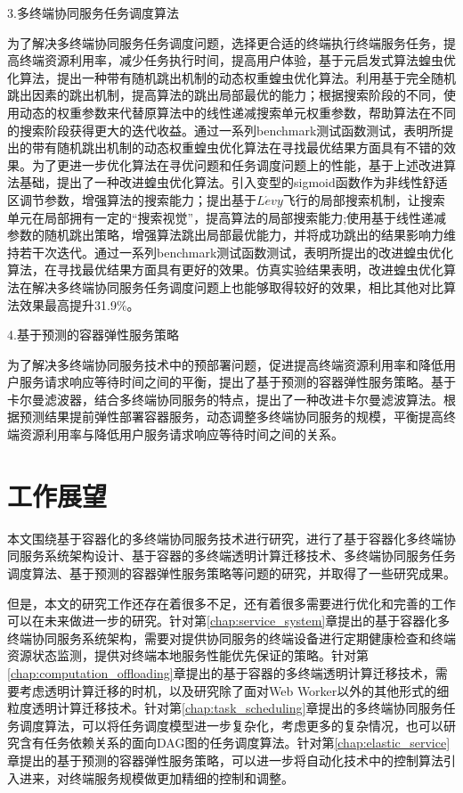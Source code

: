 3.多终端协同服务任务调度算法 

为了解决多终端协同服务任务调度问题，选择更合适的终端执行终端服务任务，提高终端资源利用率，减少任务执行时间，提高用户体验，基于元启发式算法蝗虫优化算法，提出一种带有随机跳出机制的动态权重蝗虫优化算法。利用基于完全随机跳出因素的跳出机制，提高算法的跳出局部最优的能力；根据搜索阶段的不同，使用动态的权重参数来代替原算法中的线性递减搜索单元权重参数，帮助算法在不同的搜索阶段获得更大的迭代收益。通过一系列benchmark测试函数测试，表明所提出的带有随机跳出机制的动态权重蝗虫优化算法在寻找最优结果方面具有不错的效果。为了更进一步优化算法在寻优问题和任务调度问题上的性能，基于上述改进算法基础，提出了一种改进蝗虫优化算法。引入变型的sigmoid函数作为非线性舒适区调节参数，增强算法的搜索能力；提出基于$L\acute{e}vy$飞行的局部搜索机制，让搜索单元在局部拥有一定的“搜索视觉”，提高算法的局部搜索能力;使用基于线性递减参数的随机跳出策略，增强算法跳出局部最优能力，并将成功跳出的结果影响力维持若干次迭代。通过一系列benchmark测试函数测试，表明所提出的改进蝗虫优化算法，在寻找最优结果方面具有更好的效果。仿真实验结果表明，改进蝗虫优化算法在解决多终端协同服务任务调度问题上也能够取得较好的效果，相比其他对比算法效果最高提升31.9\%。

4.基于预测的容器弹性服务策略

为了解决多终端协同服务技术中的预部署问题，促进提高终端资源利用率和降低用户服务请求响应等待时间之间的平衡，提出了基于预测的容器弹性服务策略。基于卡尔曼滤波器，结合多终端协同服务的特点，提出了一种改进卡尔曼滤波算法。根据预测结果提前弹性部署容器服务，动态调整多终端协同服务的规模，平衡提高终端资源利用率与降低用户服务请求响应等待时间之间的关系。

\section{工作展望}

本文围绕基于容器化的多终端协同服务技术进行研究，进行了基于容器化多终端协同服务系统架构设计、基于容器的多终端透明计算迁移技术、多终端协同服务任务调度算法、基于预测的容器弹性服务策略等问题的研究，并取得了一些研究成果。

但是，本文的研究工作还存在着很多不足，还有着很多需要进行优化和完善的工作可以在未来做进一步的研究。针对第\ref{chap:service_system}章提出的基于容器化多终端协同服务系统架构，需要对提供协同服务的终端设备进行定期健康检查和终端资源状态监测，提供对终端本地服务性能优先保证的策略。针对第\ref{chap:computation_offloading}章提出的基于容器的多终端透明计算迁移技术，需要考虑透明计算迁移的时机，以及研究除了面对Web Worker以外的其他形式的细粒度透明计算迁移技术。针对第\ref{chap:task_scheduling}章提出的多终端协同服务任务调度算法，可以将任务调度模型进一步复杂化，考虑更多的复杂情况，也可以研究含有任务依赖关系的面向DAG图的任务调度算法。针对第\ref{chap:elastic_service}章提出的基于预测的容器弹性服务策略，可以进一步将自动化技术中的控制算法引入进来，对终端服务规模做更加精细的控制和调整。